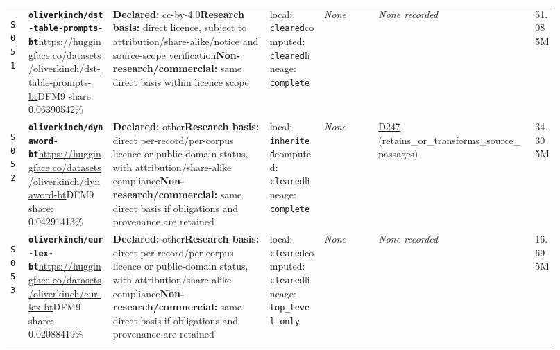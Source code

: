 \documentclass[9pt,a4paper]{article}
\newcommand{\srcid}[1]{\hypertarget{src:#1}{\texttt{#1}}}
\begin{document}
\begin{landscape}
\begin{longtable}{@{}L{0.03\linewidth}L{0.14\linewidth}L{0.26\linewidth}L{0.09\linewidth}L{0.09\linewidth}L{0.265\linewidth}L{0.045\linewidth}@{}}
\srcid{S051} & \textbf{\nolinkurl{oliverkinch/dst-table-prompts-bt}}\newline \url{https://huggingface.co/datasets/oliverkinch/dst-table-prompts-bt}\newline DFM9 share: 0.06390542\% & \textbf{Declared:} cc-by-4.0\newline \textbf{Research basis:} direct licence, subject to attribution/share-alike/notice and source-scope verification\newline \textbf{Non-research/commercial:} same direct basis within licence scope & local: \texttt{cleared}\newline computed: \texttt{cleared}\newline lineage: \texttt{complete} & \textit{None} & \textit{None recorded} & 51.085M \\
\srcid{S052} & \textbf{\nolinkurl{oliverkinch/dynaword-bt}}\newline \url{https://huggingface.co/datasets/oliverkinch/dynaword-bt}\newline DFM9 share: 0.04291413\% & \textbf{Declared:} other\newline \textbf{Research basis:} direct per-record/per-corpus licence or public-domain status, with attribution/share-alike compliance\newline \textbf{Non-research/commercial:} same direct basis if obligations and provenance are retained & local: \texttt{inherited}\newline computed: \texttt{cleared}\newline lineage: \texttt{complete} & \textit{None} & \hyperlink{dep:D247}{D247} (retains\_or\_transforms\_source\_passages) & 34.305M \\
\srcid{S053} & \textbf{\nolinkurl{oliverkinch/eur-lex-bt}}\newline \url{https://huggingface.co/datasets/oliverkinch/eur-lex-bt}\newline DFM9 share: 0.02088419\% & \textbf{Declared:} other\newline \textbf{Research basis:} direct per-record/per-corpus licence or public-domain status, with attribution/share-alike compliance\newline \textbf{Non-research/commercial:} same direct basis if obligations and provenance are retained & local: \texttt{cleared}\newline computed: \texttt{cleared}\newline lineage: \texttt{top\_level\_only} & \textit{None} & \textit{None recorded} & 16.695M \\

\end{longtable}
\end{landscape}
\end{document}
